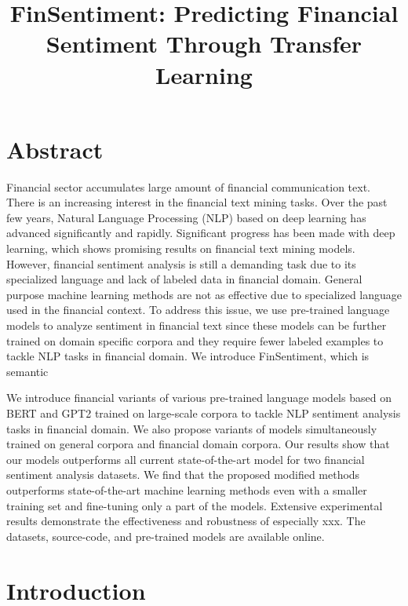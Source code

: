 \documentclass[11pt]{article}
\title{\vspace{-4cm} FinSentiment: Predicting Financial Sentiment Through Transfer Learning}
\author{}
\date{}
\begin{document}
\maketitle


\section{Abstract}

Financial sector accumulates large amount of financial communication
text. There is an increasing interest in the financial text mining tasks. Over the past few years, Natural Language Processing (NLP) based on deep learning
has advanced significantly and rapidly. Significant progress has been made with deep
learning, which shows promising results on financial text mining
models. However, financial sentiment analysis is still a demanding task due to its specialized
language and lack of labeled data in financial domain. General purpose
machine learning methods are not as effective due to specialized
language used in the financial context. To address this issue, we use pre-trained language models to analyze sentiment
in financial text since these models can be further trained on domain specific
corpora and they require fewer labeled examples to tackle NLP tasks in financial domain.
We introduce FinSentiment, which is semantic

We introduce financial variants of various pre-trained language models
based on BERT and GPT2 trained on large-scale corpora to tackle NLP sentiment analysis tasks in
financial domain. We also propose variants of models simultaneously
trained on general corpora and financial domain corpora. Our results show that our models outperforms all current
state-of-the-art model for two financial sentiment analysis datasets. We find that the proposed modified methods outperforms state-of-the-art machine learning
methods even with a smaller training set and fine-tuning only a part of
the models. Extensive experimental results demonstrate the effectiveness
and robustness of especially xxx. The datasets, source-code, and
pre-trained models are available online.

\section{Introduction}
\end{document}
